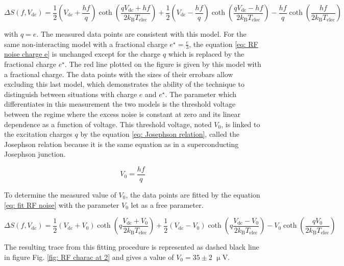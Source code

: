 \begin{equation}
\Delta S \left(f,V_{\mathrm{dc}}\right) = \frac{1}{2}\left(V_{\mathrm{dc}}+\frac{hf}{q}\right)\coth\left(\frac{qV_{\mathrm{dc}}+hf}{2k_{\mathrm{B}}T_{\mathrm{elec}}}\right)+\frac{1}{2}\left(V_{\mathrm{dc}}-\frac{hf}{q}\right)\coth\left(\frac{qV_{\mathrm{dc}}-hf}{2k_{\mathrm{B}}T_{\mathrm{elec}}}\right)-\frac{hf}{q}\coth\left(\frac{hf}{2k_{\mathrm{B}}T_{\mathrm{elec}}}\right) \label{eq: RF noise charge e}
\end{equation}

with $q = e$.
The measured data points are consistent with this model. For the same non-interacting model with a fractional charge $e^{\star} = \frac{e}{3}$, the equation \eqref{eq: RF noise charge e} is unchanged except for the charge $q$ which is replaced by the fractional charge $e^{\star}$.
The red line plotted on the figure is given by this model with a fractional charge.
The data points with the sizes of their errobars allow excluding this last model, which demonstrates the ability of the technique to distinguish between situations with charge $e$ and $e^{\star}$.
The parameter which differentiates in this measurement the two models is the threshold voltage between the regime where the excess noise is constant at zero and its linear dependence as a function of voltage.
This threshold voltage, noted $V_{0}$, is linked to the excitation charges $q$ by the equation \eqref{eq: Josephson relation}, called the Josephson relation because it is the same equation as in a superconducting Josephson junction.

\begin{equation}
V_{0} = \frac{hf}{q} \label{eq: Josephson relation}
\end{equation}

To determine the measured value of $V_{0}$, the data points are fitted by the equation \eqref{eq: fit RF noise} with the parameter $V_{0}$ let as a free parameter.

\begin{equation}
\Delta S \left(f,V_{\mathrm{dc}}\right) = \frac{1}{2}\left(V_{\mathrm{dc}}+V_{0}\right)\coth\left(q\frac{V_{\mathrm{dc}}+V_{0}}{2k_{\mathrm{B}}T_{\mathrm{elec}}}\right)+\frac{1}{2}\left(V_{\mathrm{dc}}-V_{0}\right)\coth\left(q\frac{V_{\mathrm{dc}}-V_{0}}{2k_{\mathrm{B}}T_{\mathrm{elec}}}\right)-V_{0}\coth\left(\frac{qV_{0}}{2k_{\mathrm{B}}T_{\mathrm{elec}}}\right) \label{eq: fit RF noise}
\end{equation}

The resulting trace from this fitting procedure is represented as dashed black line in figure Fig. \ref{fig: RF charac at 2} and gives a value of $V_{0} = 35 \pm 2$ $\upmu$V.

